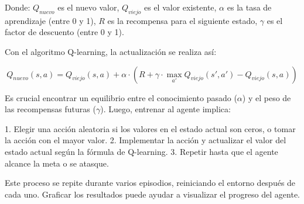 \documentclass{article}
\begin{document}
\vspace{0.5cm}

Donde:
\(Q_{nuevo}\) es el nuevo valor,
\(Q_{viejo}\) es el valor existente,
\(\alpha\) es la tasa de aprendizaje (entre 0 y 1),
\(R\) es la recompensa para el siguiente estado,
\(\gamma\) es el factor de descuento (entre 0 y 1).

\vspace{0.5cm}

Con el algoritmo Q-learning, la actualización se realiza así:

\vspace{0.5cm}

\[
Q_{nuevo}(s, a) = Q_{viejo}(s, a) + \alpha \cdot \left( R + \gamma \cdot \max_{a'} Q_{viejo}(s', a') - Q_{viejo}(s, a) \right)
\]

\vspace{0.5cm}

Es crucial encontrar un equilibrio entre el conocimiento pasado (\(\alpha\)) y el peso de las recompensas futuras (\(\gamma\)). Luego, entrenar al agente implica:

\vspace{0.5cm}

1. Elegir una acción aleatoria si los valores en el estado actual son ceros, o tomar la acción con el mayor valor.
2. Implementar la acción y actualizar el valor del estado actual según la fórmula de Q-learning.
3. Repetir hasta que el agente alcance la meta o se atasque.

\vspace{0.5cm}

Este proceso se repite durante varios episodios, reiniciando el entorno después de cada uno. Graficar los resultados puede ayudar a visualizar el progreso del agente.

\vspace{0.5cm}
\end{document}
